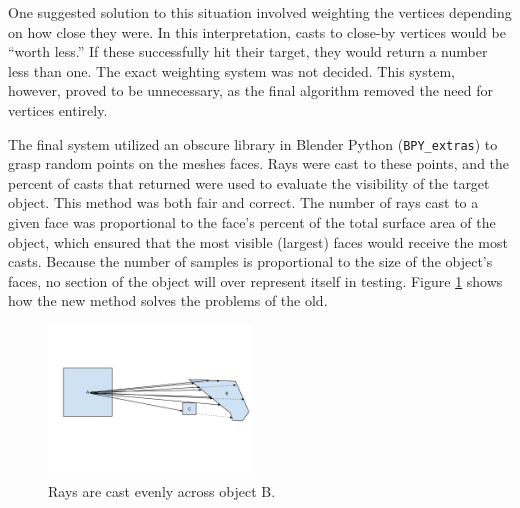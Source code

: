 One suggested solution to this situation involved weighting the vertices depending on how close they were. In this interpretation, casts to close-by vertices would be “worth less.” If these successfully hit their target, they would return a number less than one. The exact weighting system was not decided. This system, however, proved to be unnecessary, as the final algorithm removed the need for vertices entirely. 

The final system utilized an obscure library in Blender Python (\texttt{BPY\_extras}) to grasp random points on the meshes faces. Rays were cast to these points, and the percent of casts that returned were used to evaluate the visibility of the target object. This method was both fair and correct. The number of rays cast to a given face was proportional to the face's percent of the total surface area of the object, which ensured that the most visible (largest) faces would receive the most casts. Because the number of samples is proportional to the size of the object's faces, no section of the object will over represent itself in testing. Figure \ref{fig:vision7} shows how the new method solves the problems of the old.

\begin{figure}[h]
	\begin{center}
		\includegraphics[width=0.48\textwidth]{figures/vision7.png}
	\end{center}
	\caption{Rays are cast evenly across object B.}
	\label{fig:vision7}
\end{figure}

